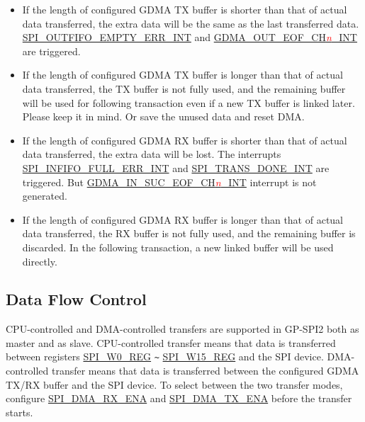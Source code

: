 \documentclass[main\_\_EN.tex]{subfiles}
\begin{document}
\begin{itemize}
    \item If the length of configured GDMA TX buffer is shorter than that of actual data transferred, the extra data will be the same as the last transferred data. \hyperref[int:SPIOUTFIFOEMPTYERRINT]{SPI\_OUTFIFO\_EMPTY\_ERR\_INT} and \hyperref[int:GDMAOUTEOFINT]{GDMA\_OUT\_EOF\_CH\textcolor{red}{\it{n}}\_INT} are triggered.

    \item If the length of configured GDMA TX buffer is longer than that of actual data transferred, the TX buffer is not fully used, and the remaining buffer will be used for following transaction even if a new TX buffer is linked later. Please keep it in mind. Or save the unused data and reset DMA.

    \item If the length of configured GDMA RX buffer is shorter than that of actual data transferred, the extra data will be lost. The interrupts \hyperref[int:SPIINFIFOFULLERRINT]{SPI\_INFIFO\_FULL\_ERR\_INT} and \hyperref[int:SPITRANSDONEINT]{SPI\_TRANS\_DONE\_INT} are triggered. But \hyperref[int:GDMAINSUCEOFINT]{GDMA\_IN\_SUC\_EOF\_CH\textcolor{red}{\it{n}}\_INT} interrupt is not generated.

    \item If the length of configured GDMA RX buffer is longer than that of actual data transferred, the RX buffer is not fully used, and the remaining buffer is discarded. In the following transaction, a new linked buffer will be used directly.

\end{itemize}

\subsection{Data Flow Control}\label{sec:spi-data-flow-control-master-slave-mode}

CPU-controlled and DMA-controlled transfers are supported in GP-SPI2 both as master and as slave. CPU-controlled transfer means that data is transferred between registers \hyperref[regdesc:SPIW0REG]{SPI\_W0\_REG} \verb+~+ \hyperref[regdesc:SPIW0REG]{SPI\_W15\_REG} and the SPI device. DMA-controlled transfer means that data is transferred between the configured GDMA TX/RX buffer and the SPI device. To select between the two transfer modes, configure \hyperref[fielddesc:SPIDMARXENA]{SPI\_DMA\_RX\_ENA} and \hyperref[fielddesc:SPIDMATXENA]{SPI\_DMA\_TX\_ENA} before the transfer starts.
\end{document}
